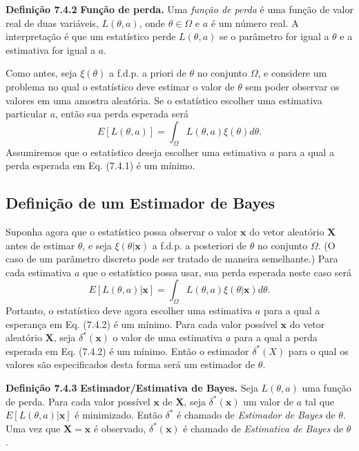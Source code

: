 \vspace{1cm}
\noindent\textbf{Definição 7.4.2} \quad \textbf{Função de perda.} Uma \textit{função de perda} é uma função de valor real de duas variáveis, $L(\theta, a)$, onde $\theta \in \Omega$ e $a$ é um número real. A interpretação é que um estatístico perde $L(\theta, a)$ se o parâmetro for igual a $\theta$ e a estimativa for igual a $a$.

\vspace{1cm}
Como antes, seja $\xi(\theta)$ a f.d.p. a priori de $\theta$ no conjunto $\Omega$, e considere um problema no qual o estatístico deve estimar o valor de $\theta$ sem poder observar os valores em uma amostra aleatória. Se o estatístico escolher uma estimativa particular $a$, então sua perda esperada será
\begin{equation}
E[L(\theta, a)] = \int_{\Omega} L(\theta, a)\xi(\theta)d\theta. \tag{7.4.1}
\end{equation}
Assumiremos que o estatístico deseja escolher uma estimativa $a$ para a qual a perda esperada em Eq. (7.4.1) é um mínimo.

\subsection*{Definição de um Estimador de Bayes}
Suponha agora que o estatístico possa observar o valor $\mathbf{x}$ do vetor aleatório $\mathbf{X}$ antes de estimar $\theta$, e seja $\xi(\theta|\mathbf{x})$ a f.d.p. a posteriori de $\theta$ no conjunto $\Omega$. (O caso de um parâmetro discreto pode ser tratado de maneira semelhante.) Para cada estimativa $a$ que o estatístico possa usar, sua perda esperada neste caso será
\begin{equation}
E[L(\theta, a)|\mathbf{x}] = \int_{\Omega} L(\theta, a)\xi(\theta|\mathbf{x})d\theta. \tag{7.4.2}
\end{equation}
Portanto, o estatístico deve agora escolher uma estimativa $a$ para a qual a esperança em Eq. (7.4.2) é um mínimo.
Para cada valor possível $\mathbf{x}$ do vetor aleatório $\mathbf{X}$, seja $\delta^*(\mathbf{x})$ o valor de uma estimativa $a$ para a qual a perda esperada em Eq. (7.4.2) é um mínimo. Então o estimador $\delta^*(X)$ para o qual os valores são especificados desta forma será um estimador de $\theta$.

\vspace{1cm}
\noindent\textbf{Definição 7.4.3} \quad \textbf{Estimador/Estimativa de Bayes.} Seja $L(\theta, a)$ uma função de perda. Para cada valor possível $\mathbf{x}$ de $\mathbf{X}$, seja $\delta^*(\mathbf{x})$ um valor de $a$ tal que $E[L(\theta, a)|\mathbf{x}]$ é minimizado. Então $\delta^*$ é chamado de \textit{Estimador de Bayes} de $\theta$. Uma vez que $\mathbf{X}=\mathbf{x}$ é observado, $\delta^*(\mathbf{x})$ é chamado de \textit{Estimativa de Bayes} de $\theta$.

